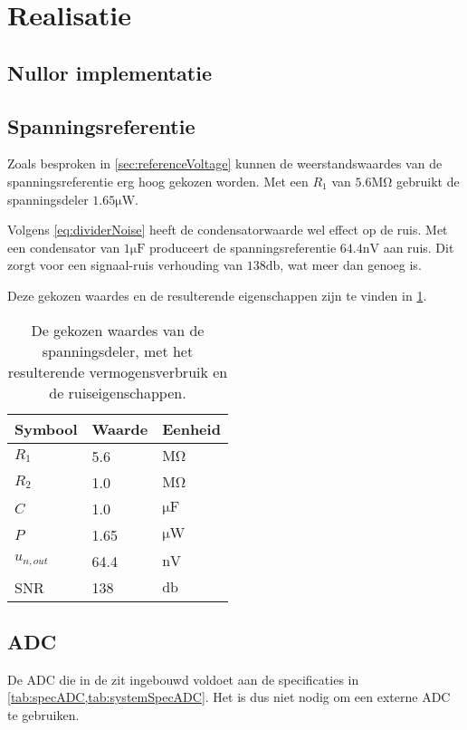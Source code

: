 \section{Realisatie}


\subsection{Nullor implementatie}


\subsection{Spanningsreferentie}
Zoals besproken in \cref{sec:referenceVoltage} kunnen de weerstandswaardes van de spanningsreferentie erg hoog gekozen worden. Met een $R_1$ van $5.6\si{\mega\ohm}$ gebruikt de spanningsdeler $1.65\si{\micro\watt}$.

Volgens \cref{eq:dividerNoise} heeft de condensatorwaarde wel effect op de ruis. Met een condensator van $1\si{\micro\farad}$ produceert de spanningsreferentie $64.4\si{\nano\volt}$ aan ruis. Dit zorgt voor een signaal-ruis verhouding van $138\si{\decibel}$, wat meer dan genoeg is.

Deze gekozen waardes en de resulterende eigenschappen zijn te vinden in \cref{tab:divider}.

\begin{table}[ht]
\centering
\begin{tabular}{l|l|l}
    Symbool & Waarde & Eenheid \\
    \hline
    $R_1$       & 5.6  & $\si{\mega\ohm}$   \\
    $R_2$       & 1.0  & $\si{\mega\ohm}$   \\
    $C$         & 1.0  & $\si{\micro\farad}$\\
    $P$         & 1.65 & $\si{\micro\watt}$ \\
    $u_{n,out}$ & 64.4 & $\si{\nano\volt}$  \\
    SNR         & 138  & $\si{\decibel}$
\end{tabular}
\caption{De gekozen waardes van de spanningsdeler, met het resulterende vermogensverbruik en de ruiseigenschappen.}
\label{tab:divider}
\end{table}


\subsection{ADC}
De ADC die in de \mcu zit ingebouwd voldoet aan de specificaties in \cref{tab:specADC,tab:systemSpecADC}\cite{nrf52810}. Het is dus niet nodig om een externe ADC te gebruiken. 


